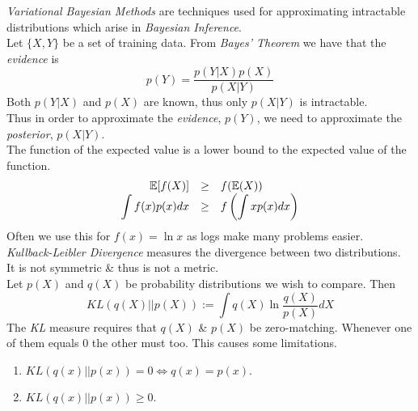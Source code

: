 \documentclass[11pt,a4paper]{article}
\begin{document}
\textit{Variational Bayesian Methods} are techniques used for approximating intractable distributions which arise in \textit{Bayesian Inference}.\\
Let $\{X,Y\}$ be a set of training data. From \textit{Bayes' Theorem} we have that the \textit{evidence} is
$$p(Y)=\frac{p(Y|X)p(X)}{p(X|Y)}$$
Both $p(Y|X)$ and $p(X)$ are known, thus only $p(X|Y)$ is intractable.\\
Thus in order to approximate the \textit{evidence}, $p(Y)$, we need to approximate the \textit{posterior}, $p(X|Y)$.\\

The function of the expected value is a lower bound to the expected value of the function.
\[\begin{array}{rcl}
\mathbb{E}[f(X)]&\geq&f(\mathbb{E}(X))\\
\displaystyle\int f(x)p(x)dx&\geq&f\left(\displaystyle\int xp(x)dx\right)
\end{array}\]
\nb Often we use this for $f(x)=\ln x$ as logs make many problems easier.\\

\textit{Kullback-Leibler Divergence} measures the divergence between two distributions.\\
It is not symmetric \& thus is not a metric.\\
Let $p(X)$ and $q(X)$ be probability distributions we wish to compare. Then
$$KL(q(X)||p(X)):=\int q(X)\ln\dfrac{q(X)}{p(X)}dX$$
\nb The \textit{KL} measure requires that $q(X)$ \& $p(X)$ be zero-matching. \ie Whenever one of them equals 0 the other must too. This causes some limitations.\\

\begin{enumerate}
	\item $KL(q(x)||p(x))=0\Longleftrightarrow q(x)=p(x)$.
	\item $KL(q(x)||p(x))\geq0$.
\end{enumerate}
\end{document}
